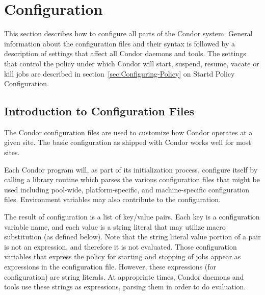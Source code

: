\section{\label{sec:Configuring-Condor}Configuration}


This section describes how to configure all parts of the Condor
system.  General information about the configuration
files and their syntax is followed by a description of
settings that affect all
Condor daemons and tools.
The 
settings that control the policy under which Condor will start,
suspend, resume, vacate or kill jobs
are described in 
section~\ref{sec:Configuring-Policy} on Startd Policy Configuration. 

\subsection{\label{sec:Intro-to-Config-Files}Introduction to
Configuration Files} 

The Condor configuration files are used to customize how Condor
operates at a given site.  The basic configuration as shipped with
Condor works well for most sites.

Each Condor program will, as part of its initialization process,
configure itself by calling a library routine which parses the
various configuration files that might be used including pool-wide,
platform-specific, and machine-specific configuration files.
Environment variables may also contribute to the configuration.

The result of configuration is a list of key/value pairs.
Each key is a configuration variable name,
and each value is a string literal
that may utilize macro substitution (as defined below).
Note that the string literal value portion of a pair is not an expression,
and therefore it is not evaluated.
Those configuration variables that express the policy for
starting and stopping of jobs appear as expressions in the
configuration file.
However, these expressions (for configuration) are string literals.
At appropriate times,
Condor daemons and tools use these strings as expressions,
parsing them in order to do evaluation.


